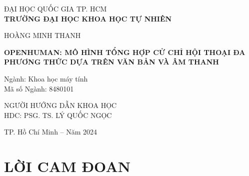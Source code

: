 \documentclass[50pt]{extarticle}
\begin{document}
\begin{mdframed}[linewidth=1pt, 
                 linecolor=black, 
                 innerleftmargin=10mm, 
                 innerrightmargin=10mm, 
                 innertopmargin=10mm, 
                 innerbottommargin=10mm]
    \centering
    \vspace*{1cm}
    
    \Large ĐẠI HỌC QUỐC GIA TP. HCM\\
    \vspace{0.25cm}
    \Large \textbf{TRƯỜNG ĐẠI HỌC KHOA HỌC TỰ NHIÊN}\\
    
    \vspace{2cm}
    
    \Large HOÀNG MINH THANH \\
    
    \vspace{3cm}
    
    \Large \textbf{\MakeUppercase{OPENHUMAN: MÔ HÌNH TỔNG HỢP CỬ CHỈ HỘI THOẠI ĐA PHƯƠNG THỨC DỰA TRÊN VĂN BẢN VÀ ÂM THANH}}\\
    
    \vspace{1cm}
    
    \flushleft
    {\fontsize{13}{15}\selectfont Ngành: Khoa học máy tính}\\
    {\fontsize{13}{15}\selectfont Mã số Ngành: 8480101}\\
    
    \vspace{3cm}
    
    \centering
    \Large NGƯỜI HƯỚNG DẪN KHOA HỌC\\
    \Large HDC: PSG. TS. LÝ QUỐC NGỌC \\

    \vfill
    \vspace{3cm}
    
    {\fontsize{12}{13} TP. Hồ Chí Minh – Năm 2024}
\end{mdframed}
    
 

\pagebreak
{}




 \pagebreak

\section*{\centering  LỜI CAM ĐOAN}
{}
\end{document}
